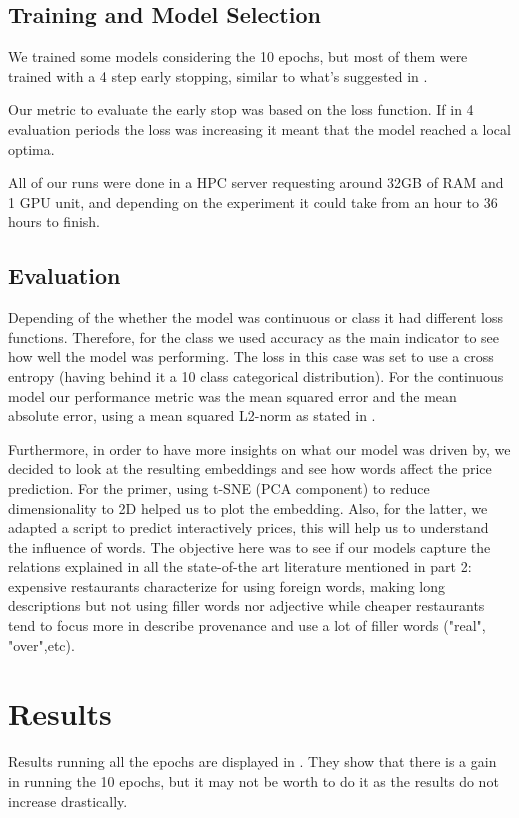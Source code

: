 \documentclass[11pt,letterpaper]{article}
\begin{document}
\subsection{Training and Model Selection}
We trained some models considering the 10 epochs, but most of them were trained with a 4 step early stopping, similar to what's suggested in \cite{cho2015natural}. 

Our metric to evaluate the early stop was based on the loss function. If in 4 evaluation periods the loss was increasing it meant that the model reached a local optima. 

All of our runs were done in a HPC server requesting around 32GB of RAM and 1 GPU unit, and depending on the experiment it could take from an hour to 36 hours to finish. 

\subsection{Evaluation}
Depending of the whether the model was continuous or class it had different loss functions. Therefore, for the class we used accuracy as the main indicator to see how well the model was performing. The loss in this case was set to use a cross entropy (having behind it a 10 class categorical distribution). 
For the continuous model our performance metric was the mean squared error and the mean absolute error, using a mean squared L2-norm as stated in \cite{cho2015natural}.

Furthermore, in order to have more insights on what our model was driven by, we decided to look at the resulting embeddings and see how words affect the price prediction. For the primer, using t-SNE (PCA component) to reduce dimensionality to 2D helped us to plot the embedding. Also, for the latter, we adapted a script to predict interactively prices, this will help us to understand the influence of words. The objective here was to see if our models capture the relations explained in all the state-of-the art literature mentioned in part 2: expensive restaurants characterize for using foreign words, making long descriptions but not using filler words nor adjective while cheaper restaurants tend to focus more in describe provenance and use a lot of filler words ("real", "over",etc). 

\section{Results}
Results running all the epochs are displayed in .
They show that there is a gain in running the 10 epochs, but it may not be worth to do it as the results do not increase drastically. 
\end{document}
